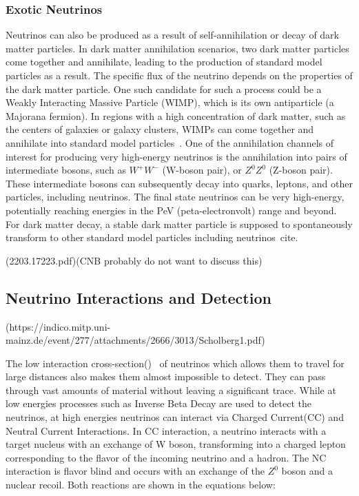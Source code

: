 \subsubsection*{Exotic Neutrinos}
\label{subsubsec:ExoticNu}

Neutrinos can also be produced as a result of self-annihilation or decay of dark matter particles. In dark matter annihilation scenarios, two dark matter particles come together and annihilate, leading to the production of standard model particles as a result. The specific flux of the neutrino depends on the properties of the dark matter particle. One such candidate for such a process could be a Weakly Interacting Massive Particle (WIMP), which is its own antiparticle (a Majorana fermion). In regions with a high concentration of dark matter, such as the centers of galaxies or galaxy clusters, WIMPs can come together and annihilate into standard model particles~\cite{}. One of the annihilation channels of interest for producing very high-energy neutrinos is the annihilation into pairs of intermediate bosons, such as $W^+W^-$ (W-boson pair), or $Z^0Z^0$ (Z-boson pair). These intermediate bosons can subsequently decay into quarks, leptons, and other particles, including neutrinos. The final state neutrinos can be very high-energy, potentially reaching energies in the PeV (peta-electronvolt) range and beyond. For dark matter decay, a stable dark matter particle is supposed to spontaneously transform to other standard model particles including neutrinos~cite{}. 

(2203.17223.pdf)(CNB probably do not want to discuss this)


\subsection{Neutrino Interactions and Detection }(https://indico.mitp.uni-mainz.de/event/277/attachments/2666/3013/Scholberg1.pdf)
\label{subsec:Nuintdet}

The low interaction cross-section()~\cite{} of neutrinos which allows them to travel for large distances also makes them almost impossible to detect. They can pass through vast amounts of material without leaving a significant trace. While at low energies processes such as Inverse Beta Decay are used to detect the neutrinos, at high energies neutrinos can interact via Charged Current(CC) and Neutral Current Interactions. In CC interaction, a neutrino interacts with a target nucleus with an exchange of W boson, transforming into a charged lepton corresponding to the flavor of the incoming neutrino and a hadron. The NC interaction is flavor blind and occurs with an exchange of the $Z^0$ boson and a nuclear recoil. Both reactions are shown in the equations below:

